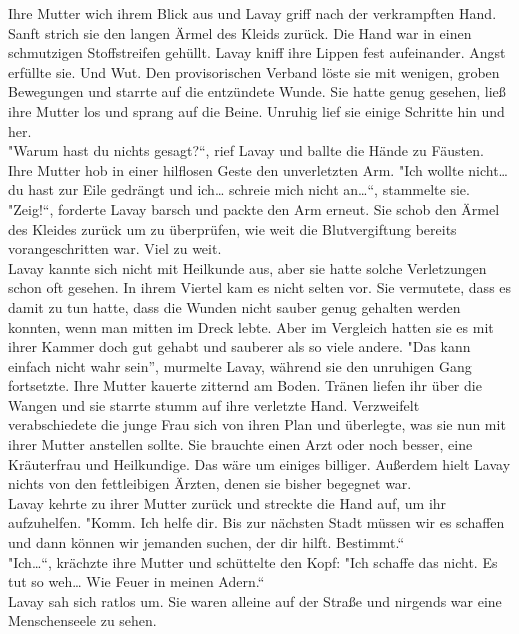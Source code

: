 Ihre Mutter wich ihrem Blick aus und Lavay griff nach der verkrampften Hand. Sanft strich sie den 
langen Ärmel des Kleids zurück. Die Hand war in einen schmutzigen Stoffstreifen gehüllt. Lavay 
kniff ihre Lippen fest aufeinander. Angst erfüllte sie. Und Wut. Den provisorischen Verband löste 
sie mit wenigen, groben Bewegungen und starrte auf die entzündete Wunde. Sie hatte genug gesehen, 
ließ ihre Mutter los und sprang auf die Beine. Unruhig lief sie einige Schritte hin und her.\\
"Warum hast du nichts gesagt?``, rief Lavay und ballte die Hände zu Fäusten. \\
Ihre Mutter hob in einer hilflosen Geste den unverletzten Arm. "Ich wollte nicht… du hast zur Eile 
gedrängt und ich… schreie mich nicht an…``, stammelte sie.\\
"Zeig!``, forderte Lavay barsch und packte den Arm erneut. Sie schob den Ärmel des Kleides zurück 
um zu überprüfen, wie weit die Blutvergiftung bereits vorangeschritten war. Viel zu weit.\\
Lavay kannte sich nicht mit Heilkunde aus, aber sie hatte solche Verletzungen schon oft gesehen. In 
ihrem Viertel kam es nicht selten vor. Sie vermutete, dass es damit zu tun hatte, dass die Wunden 
nicht sauber genug gehalten werden konnten, wenn man mitten im Dreck lebte. Aber im Vergleich 
hatten sie es mit ihrer Kammer doch gut gehabt und sauberer als so viele andere.
"Das kann einfach nicht wahr sein'', murmelte Lavay, während sie den unruhigen Gang fortsetzte.
Ihre Mutter kauerte zitternd am Boden. Tränen liefen ihr über die Wangen und sie starrte stumm auf 
ihre verletzte Hand. Verzweifelt verabschiedete die junge Frau sich von ihren Plan und überlegte, 
was sie nun mit ihrer Mutter anstellen sollte. Sie brauchte einen Arzt oder noch besser, eine 
Kräuterfrau und Heilkundige. Das wäre um einiges billiger. Außerdem hielt Lavay nichts von den 
fettleibigen Ärzten, denen sie bisher begegnet war.\\ 
Lavay kehrte zu ihrer Mutter zurück und streckte die Hand auf, um ihr aufzuhelfen. 
"Komm. Ich helfe dir. Bis zur nächsten Stadt müssen wir es schaffen und dann können wir jemanden 
suchen, der dir hilft. Bestimmt.``\\
"Ich…``, krächzte ihre Mutter und schüttelte den Kopf: "Ich schaffe das nicht. Es tut so weh… Wie 
Feuer in meinen Adern.``\\
Lavay sah sich ratlos um. Sie waren alleine auf der Straße und nirgends war eine Menschenseele zu 
sehen. \\
